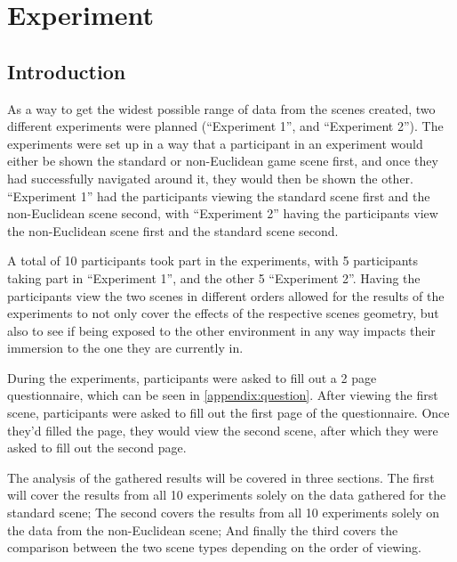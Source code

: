 \chapter{Experiment}
\label{exp}

	\section{Introduction}
	\label{exp:intro}

		As a way to get the widest possible range of data from the scenes created, two different experiments were planned (\enquote{Experiment 1}, and \enquote{Experiment 2}).
		The experiments were set up in a way that a participant in an experiment would either be shown the standard or non-Euclidean game scene first, and once they had successfully navigated around it, they would then be shown the other.
		\enquote{Experiment 1} had the participants viewing the standard scene first and the non-Euclidean scene second, with \enquote{Experiment 2} having the participants view the non-Euclidean scene first and the standard scene second.

		A total of 10 participants took part in the experiments, with 5 participants taking part in \enquote{Experiment 1}, and the other 5 \enquote{Experiment 2}.
		Having the participants view the two scenes in different orders allowed for the results of the experiments to not only cover the effects of the respective scenes geometry, but also to see if being exposed to the other environment in any way impacts their immersion to the one they are currently in. %

		During the experiments, participants were asked to fill out a 2 page questionnaire, which can be seen in \autoref{appendix:question}.
		After viewing the first scene, participants were asked to fill out the first page of the questionnaire. Once they'd filled the page, they would view the second scene, after which they were asked to fill out the second page. %

		The analysis of the gathered results will be covered in three sections. The first will cover the results from all 10 experiments solely on the data gathered for the standard scene; The second covers the results from all 10 experiments solely on the data from the non-Euclidean scene; And finally the third covers the comparison between the two scene types depending on the order of viewing. %


